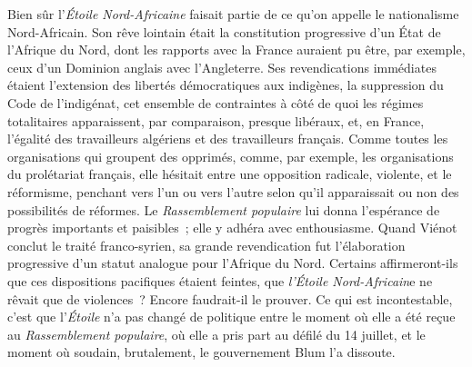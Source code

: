 \documentclass[french,twoside]{book} %
\begin{document}
Bien sûr l'{\itshape Étoile Nord-Africaine} faisait partie de ce qu'on appelle le nationalisme Nord-Africain. Son rêve lointain était la constitution progressive d'un État de l'Afrique du Nord, dont les rapports avec la France auraient pu être, par exemple, ceux d'un Dominion anglais avec l'Angleterre. Ses reven­dications immédiates étaient l'extension des libertés démocratiques aux indigènes, la suppression du Code de l'indigénat, cet ensemble de contraintes à côté de quoi les régimes totalitaires apparaissent, par comparaison, presque libéraux, et, en France, l'égalité des travailleurs algériens et des travailleurs français. Comme toutes les organisations qui groupent des opprimés, comme, par exemple, les organisations du prolétariat français, elle hésitait entre une opposition radicale, violente, et le réformisme, penchant vers l'un ou vers l'autre selon qu'il apparaissait ou non des possibilités de réformes. Le {\itshape Rassem­blement populaire} lui donna l'espérance de progrès importants et paisibles ; elle y adhéra avec enthousiasme. Quand Viénot conclut le traité franco-syrien, sa grande revendication fut l'élaboration progressive d'un statut analogue pour l'Afrique du Nord. Certains affirmeront-ils que ces dispositions pacifiques étaient feintes, que {\itshape l'Étoile Nord-Africain}e ne rêvait que de violences ? Encore faudrait-il le prouver. Ce qui est incontestable, c'est que l'{\itshape Étoile} n'a pas changé de politique entre le moment où elle a été reçue au {\itshape Rassemblement populaire}, où elle a pris part au défilé du 14 juillet, et le moment où soudain, brutalement, le gouvernement Blum l'a dissoute.\par
\end{document}

